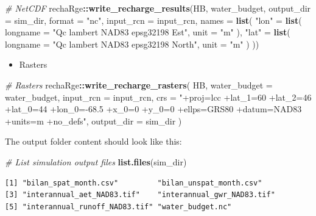 \documentclass[
]{book}
\newenvironment{Shaded}{\begin{snugshade}}{\end{snugshade}}
\newcommand{\AttributeTok}[1]{\textcolor[rgb]{0.13,0.29,0.53}{#1}}
\newcommand{\CommentTok}[1]{\textcolor[rgb]{0.56,0.35,0.01}{\textit{#1}}}
\newcommand{\FunctionTok}[1]{\textcolor[rgb]{0.13,0.29,0.53}{\textbf{#1}}}
\newcommand{\NormalTok}[1]{#1}
\newcommand{\OtherTok}[1]{\textcolor[rgb]{0.56,0.35,0.01}{#1}}
\newcommand{\SpecialCharTok}[1]{\textcolor[rgb]{0.81,0.36,0.00}{\textbf{#1}}}
\newcommand{\StringTok}[1]{\textcolor[rgb]{0.31,0.60,0.02}{#1}}
\providecommand{\tightlist}{%
  \setlength{\itemsep}{0pt}\setlength{\parskip}{0pt}}
\begin{document}
\begin{Shaded}
\begin{Highlighting}[]
\CommentTok{\# NetCDF}
\NormalTok{rechaRge}\SpecialCharTok{::}\FunctionTok{write\_recharge\_results}\NormalTok{(HB, water\_budget, }\AttributeTok{output\_dir =}\NormalTok{ sim\_dir, }\AttributeTok{format =} \StringTok{"nc"}\NormalTok{, }\AttributeTok{input\_rcn =}\NormalTok{ input\_rcn, }\AttributeTok{names =} \FunctionTok{list}\NormalTok{(}
  \StringTok{"lon"} \OtherTok{=} \FunctionTok{list}\NormalTok{(}
    \AttributeTok{longname =} \StringTok{"Qc lambert NAD83 epsg32198 Est"}\NormalTok{,}
    \AttributeTok{unit =} \StringTok{"m"}
\NormalTok{  ),}
  \StringTok{"lat"} \OtherTok{=} \FunctionTok{list}\NormalTok{(}
    \AttributeTok{longname =} \StringTok{"Qc lambert NAD83 epsg32198 North"}\NormalTok{,}
    \AttributeTok{unit =} \StringTok{"m"}
\NormalTok{  )}
\NormalTok{))}
\end{Highlighting}
\end{Shaded}

\begin{itemize}
\tightlist
\item
  Rasters
\end{itemize}

\begin{Shaded}
\begin{Highlighting}[]
\CommentTok{\# Rasters}
\NormalTok{rechaRge}\SpecialCharTok{::}\FunctionTok{write\_recharge\_rasters}\NormalTok{(}
\NormalTok{  HB,}
  \AttributeTok{water\_budget =}\NormalTok{ water\_budget,}
  \AttributeTok{input\_rcn =}\NormalTok{ input\_rcn,}
  \AttributeTok{crs =} \StringTok{"+proj=lcc +lat\_1=60 +lat\_2=46 +lat\_0=44 +lon\_0={-}68.5 +x\_0=0 +y\_0=0 +ellps=GRS80 +datum=NAD83 +units=m +no\_defs"}\NormalTok{,}
  \AttributeTok{output\_dir =}\NormalTok{ sim\_dir}
\NormalTok{)}
\end{Highlighting}
\end{Shaded}

The output folder content should look like this:

\begin{Shaded}
\begin{Highlighting}[]
\CommentTok{\# List simulation output files}
\FunctionTok{list.files}\NormalTok{(sim\_dir)}
\end{Highlighting}
\end{Shaded}

\begin{verbatim}
[1] "bilan_spat_month.csv"         "bilan_unspat_month.csv"      
[3] "interannual_aet_NAD83.tif"    "interannual_gwr_NAD83.tif"   
[5] "interannual_runoff_NAD83.tif" "water_budget.nc"             
\end{verbatim}
\end{document}
